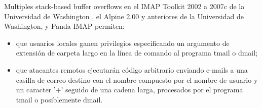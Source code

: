 Multiples stack-based buffer overflows en el  IMAP Toolkit 2002 a 2007c de la Universidad de Washington , el Alpine 2.00 y anteriores de la Universidad de Washington,
y Panda IMAP permiten:

\begin{itemize}
    \item que usuarios locales ganen privilegios especificando un argumento de extensión de carpeta largo en la línea de comando al programa tmail o dmail;
    \item que atacantes remotos ejecutarán código arbitrario enviando e-mails a una casilla de correo destino con el nombre compuesto por el nombre de usuario y un caracter '+'
    seguido de una cadena larga, procesados por el programa tmail o posiblemente dmail.
\end{itemize}
